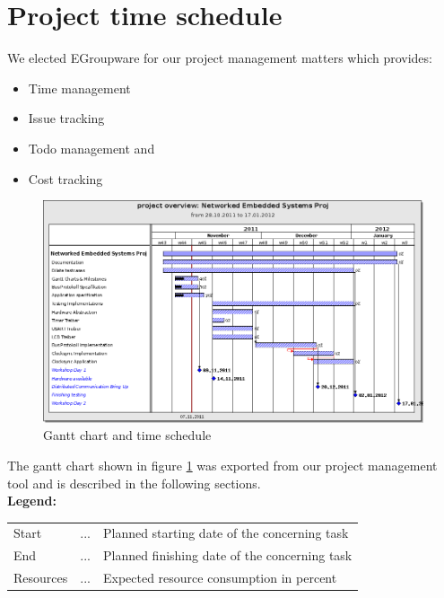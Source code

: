 \section{Project time schedule}

We elected EGroupware for our project management matters which provides:
\begin{itemize}
 \item Time management
 \item Issue tracking
 \item Todo management and
 \item Cost tracking
\end{itemize}

\begin{landscape}
\begin{figure}[H]
 \centering
 \includegraphics[scale=0.6,keepaspectratio=true]{../images/201111_ganttchart.png}
 \caption{Gantt chart and time schedule}
 \label{fig:gantt chart}
\end{figure}
\end{landscape}

The gantt chart shown in figure \ref{fig:gantt chart} was exported from our project management tool and is described in the following sections.\\

\textbf{Legend:} \\
\begin{tabular}{lcl}
Start & ... & Planned starting date of the concerning task\\
End   & ... & Planned finishing date of the concerning task\\ 
Resources & ... & Expected resource consumption in percent\\
\end{tabular}


